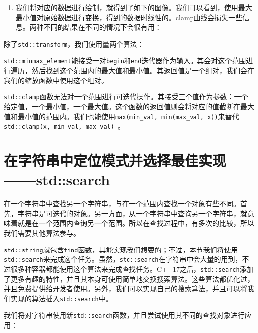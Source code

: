\begin{enumerate}

\item 我们将对应的数据进行绘制，就得到了如下的图像。我们可以看到，使用最大最小值对原始数据进行变换，得到的数据时线性的。clamp曲线会损失一些信息。两种不同的结果在不同的情况下会很有用：


\end{enumerate}


除了\texttt{std::transform}，我们使用量两个算法：

\texttt{std::minmax\_element}能接受一对\texttt{begin}和\texttt{end}迭代器作为输入。其会对这个范围进行遍历，然后找到这个范围内的最大值和最小值。其返回值是一个组对，我们会在我们的缩放函数中使用这个组对。

\texttt{std::clamp}函数无法对一个范围进行可迭代操作。其接受三个值作为参数：一个给定值，一个最小值，一个最大值。这个函数的返回值则会将对应的值截断在最大值和最小值的范围内。我们也能使用\texttt{max(min\_val, min(max\_val, x))}来替代\texttt{ std::clamp(x, min\_val, max\_val) }。


\section{在字符串中定位模式并选择最佳实现——std::search}

在一个字符串中查找另一个字符串，与在一个范围内查找一个对象有些不同。首先，字符串是可迭代的对象。另一方面，从一个字符串中查询另一个字符串，就意味着就是在一个范围内查询另一个范围。所以在查找过程中，有多次的比较，所以我们需要其他算法参与。

\texttt{std::string}就包含\texttt{find}函数，其能实现我们想要的；不过，本节我们将使用\texttt{std::search}来完成这个任务。虽然，\texttt{std::search}在字符串中会大量的用到，不过很多种容器都能使用这个算法来完成查找任务。C++17之后，\texttt{std::search}添加了更多有趣的特性，并且其本身可使用简单地交换搜索算法。这些算法都优化过，并且免费提供给开发者使用。另外，我们可以实现自己的搜索算法，并且可以将我们实现的算法插入\texttt{std::search}中。


我们将对字符串使用新\texttt{std::search}函数，并且尝试使用其不同的查找对象进行应用：

